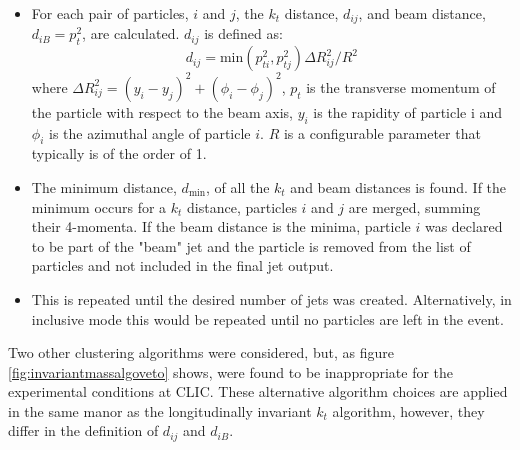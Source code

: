 \begin{itemize}
\item For each pair of particles, $i$ and $j$, the $k_{t}$ distance, $d_{ij}$, and beam distance, $d_{iB} = p_{t}^{2}$, are calculated.  $d_{ij}$ is defined as:
\begin{equation}
d_{ij} = \text{min}(p_{ti}^{2}, p_{tj}^{2}){\Delta}R^{2}_{ij}/R^{2}
\end{equation}
where ${\Delta}R^{2}_{ij} = (y_{i} - y_{j})^2 + (\phi_{i} - \phi_{j})^2$, $p_{t}$ is the transverse momentum of the particle with respect to the beam axis, $y_{i}$ is the rapidity of particle i and $\phi_{i}$ is the azimuthal angle of particle $i$. $R$ is a configurable parameter that typically is of the order of 1.
\item The minimum distance, $d_\text{min}$, of all the $k_{t}$ and beam distances is found.  If the minimum occurs for a $k_{t}$ distance, particles $i$ and $j$ are merged, summing their 4-momenta.  If the beam distance is the minima, particle $i$ was declared to be part of the "beam" jet and the particle is removed from the list of particles and not included in the final jet output.
\item This is repeated until the desired number of jets was created.  Alternatively, in inclusive mode this would be repeated until no particles are left in the event.
\end{itemize}

Two other clustering algorithms were considered, but, as figure \ref{fig:invariantmassalgoveto} shows, were found to be inappropriate for the experimental conditions at CLIC.  These alternative algorithm choices are applied in the same manor as the longitudinally invariant $k_{t}$ algorithm, however, they differ in the definition of $d_{ij}$ and $d_{iB}$.

